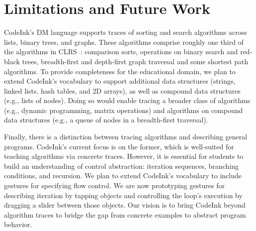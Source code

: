 \section{Limitations and Future Work}
\label{sec:design-and-future-work}

CodeInk's DM language supports traces of sorting and search algorithms
across lists, binary trees, and graphs. These algorithms comprise
roughly one third of the algorithms in CLRS~\cite{Cormen2001}:
comparison sorts, operations on binary search and red-black trees,
breadth-first and depth-first graph traversal and some shortest path
algorithms. To provide completeness for the educational domain, we plan
to extend CodeInk's vocabulary to support additional data structures
(strings, linked lists, hash tables, and 2D arrays), as well as compound
data structures (e.g., lists of nodes). Doing so would enable tracing a
broader class of algorithms (e.g., dynamic programming, matrix
operations) and algorithms on compound data structures (e.g., a queue of
nodes in a breadth-first traversal).

Finally, there is a distinction between tracing algorithms and
describing general programs. CodeInk's current focus is on the former,
which is well-suited for teaching algorithms via concrete traces.
However, it is essential for students to build an understanding of
control abstraction: iteration sequences, branching conditions, and
recursion. We plan to extend CodeInk's vocabulary to include gestures
for specifying flow control. We are now prototyping gestures for
describing iteration by tapping objects and controlling the loop's
execution by dragging a slider between those objects. Our vision is to
bring CodeInk beyond algorithm traces to bridge the gap from concrete
examples to abstract program behavior.

